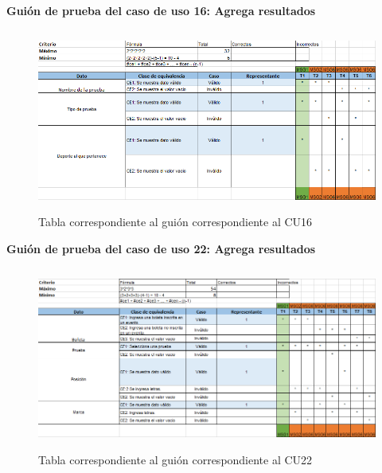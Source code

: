 	\textbf{Guión de prueba del caso de uso 16: Agrega resultados}	
	\begin{figure}[hbt!]
		\centering
		\includegraphics[width=14cm, height=6cm]{Imagenes/Pruebas/GuionPruebaCU16}
		\caption{Tabla correspondiente al guión correspondiente al CU16}
		\label{guionpruebaCU16}
	\end{figure}
	
	\textbf{Guión de prueba del caso de uso 22: Agrega resultados}	
	\begin{figure}[hbt!]
		\centering
		\includegraphics[width=14cm, height=6cm]{Imagenes/Pruebas/GuionPruebaCU22}
		\caption{Tabla correspondiente al guión correspondiente al CU22}
		\label{guionpruebaCU22}
	\end{figure}
	
	
	